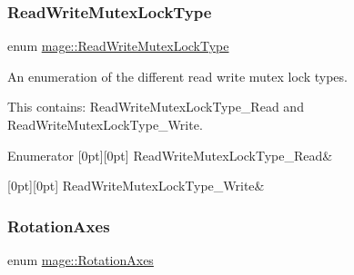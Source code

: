 \subsubsection{\texorpdfstring{Read\+Write\+Mutex\+Lock\+Type}{ReadWriteMutexLockType}}
{\footnotesize\ttfamily enum \hyperlink{namespacemage_afd76fcca37ce5c5b2227671290973c74}{mage\+::\+Read\+Write\+Mutex\+Lock\+Type}}

An enumeration of the different read write mutex lock types.

This contains\+: {\ttfamily Read\+Write\+Mutex\+Lock\+Type\+\_\+\+Read} and {\ttfamily Read\+Write\+Mutex\+Lock\+Type\+\_\+\+Write}. \begin{DoxyEnumFields}{Enumerator}
[0pt][0pt]{}\hypertarget{namespacemage_afd76fcca37ce5c5b2227671290973c74a900403891acbbc9919f9fcec04858549}{}\label{namespacemage_afd76fcca37ce5c5b2227671290973c74a900403891acbbc9919f9fcec04858549} 
Read\+Write\+Mutex\+Lock\+Type\+\_\+\+Read&\\
\hline

[0pt][0pt]{}\hypertarget{namespacemage_afd76fcca37ce5c5b2227671290973c74ae31c6ff6e73cbaa720f5359edee0da04}{}\label{namespacemage_afd76fcca37ce5c5b2227671290973c74ae31c6ff6e73cbaa720f5359edee0da04} 
Read\+Write\+Mutex\+Lock\+Type\+\_\+\+Write&\\
\hline

\end{DoxyEnumFields}
\hypertarget{namespacemage_a548e5c31b08a1078841ed21948f5bf4c}{}\label{namespacemage_a548e5c31b08a1078841ed21948f5bf4c} 
\subsubsection{\texorpdfstring{Rotation\+Axes}{RotationAxes}}
{\footnotesize\ttfamily enum \hyperlink{namespacemage_a548e5c31b08a1078841ed21948f5bf4c}{mage\+::\+Rotation\+Axes}}

